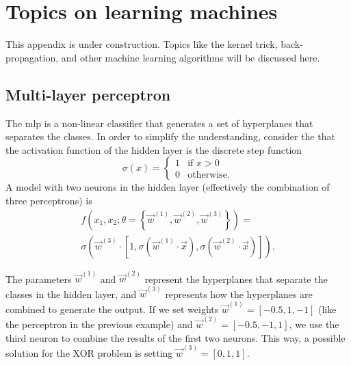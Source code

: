 \chapter{Topics on learning machines}
\label{chap:learning-machines}

This appendix is under construction.  Topics like the kernel trick, back-propagation, and
other machine learning algorithms will be discussed here.

\section{Multi-layer perceptron}
\label{sec:mlp}

The \gls{mlp} is a non-linear classifier that generates a set of hyperplanes
that separates the classes.  In order to simplify the understanding, consider the
that the activation function of the hidden layer is the discrete step function
\begin{equation*}
  \sigma(x) = \begin{cases}
    1 & \text{if } x > 0 \\
    0 & \text{otherwise.}
  \end{cases}
\end{equation*}
A model with two neurons in the hidden layer (effectively the combination of three
perceptrons) is
\begin{multline*}
  f(x_1, x_2; \theta = \left\{ \vec{w}^{(1)}, \vec{w}^{(2)}, \vec{w}^{(3)} \right\}) = \\
  \sigma\left(
    \vec{w}^{(3)} \cdot \left[1, \sigma(\vec{w}^{(1)} \cdot \vec{x}), \sigma(\vec{w}^{(2)} \cdot \vec{x})\right]
  \right)\text{.}
\end{multline*}

The parameters $\vec{w}^{(1)}$ and $\vec{w}^{(2)}$ represent the hyperplanes that separate
the classes in the hidden layer, and $\vec{w}^{(3)}$ represents how the hyperplanes are
combined to generate the output.  If we set weights $\vec{w}^{(1)} = [-0.5, 1, -1]$ (like the
perceptron in the previous example) and $\vec{w}^{(2)} = [-0.5, -1, 1]$, we use the third neuron
to combine the results of the first two neurons.  This way, a possible solution for the
XOR problem is setting $\vec{w}^{(3)} = [0, 1, 1]$.


